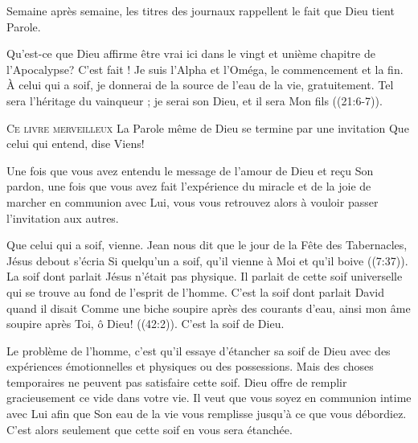 Semaine après semaine, les titres des journaux rappellent le fait
 que Dieu tient Parole. 

Qu'est-ce que Dieu affirme être vrai ici dans le vingt et unième chapitre
 de l'Apocalypse?
 \Og C'est fait ! Je suis l'Alpha et l'Oméga, le commencement et la fin.
 À celui qui a soif, je donnerai de la source de l'eau de la vie,
 gratuitement. Tel sera l'héritage du vainqueur ;
 je serai son Dieu, et il sera Mon fils \Fg{} ((21:6-7)).

\dvrule






\lettrine{C}{e livre merveilleux}
 \ocadr La Parole même de Dieu \fcadr{}
 se termine par une invitation\frcolon{} 
 \Og Que celui qui entend, dise\frcolon{} 
 \Og Viens! \Fg{} 

Une fois que vous avez entendu le message de l'amour de Dieu
 et re\c{c}u Son pardon, une fois que vous avez fait l'expérience
 du miracle et de la joie de marcher en communion avec Lui,
 vous vous retrouvez alors à vouloir passer l'invitation aux autres. 

\Og Que celui qui a soif, vienne. \Fg{}
 Jean nous dit que le jour de la Fête des Tabernacles,
 Jésus debout s'écria\frcolon{}
 \Og Si quelqu'un a soif, qu'il vienne à Moi et qu'il boive \Fg{}
 ((7:37)).
 La soif dont parlait Jésus n'était pas physique.
 Il parlait de cette soif universelle qui se trouve au fond
 de l'esprit de l'homme. C'est la soif dont parlait David
 quand il disait\frcolon{} 
 \Og Comme une biche soupire après des courants d'eau,
 ainsi mon âme soupire après Toi, ô Dieu! \Fg{} ((42:2)).
 C'est la soif de Dieu. 

Le problème de l'homme, c'est qu'il essaye d'étancher sa soif de Dieu
 avec des expériences émotionnelles et physiques ou des possessions.
 Mais des choses temporaires ne peuvent pas satisfaire cette soif.
 Dieu offre de remplir gracieusement ce vide dans votre vie.
 Il veut que vous soyez en communion intime avec Lui
 afin que Son eau de la vie vous remplisse jusqu'à ce que vous débordiez.
 C'est alors seulement que cette soif en vous sera étanchée. 


